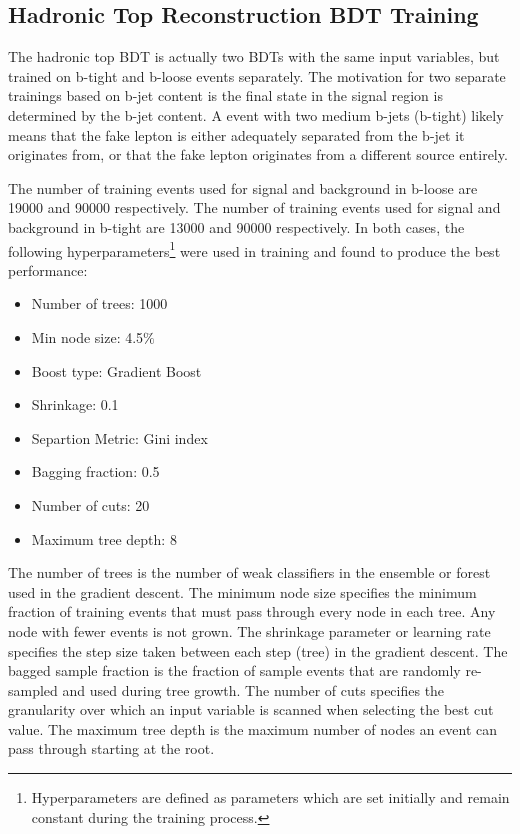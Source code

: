 \subsection{Hadronic Top Reconstruction BDT Training}
The hadronic top BDT is actually two BDTs with the same input variables, but trained on b-tight and b-loose events separately. The motivation for two separate trainings based on b-jet
content is the \ttbar final state in the signal region is determined by the b-jet content. A \ttbar event with two medium b-jets (b-tight) likely means that the fake lepton is either
adequately separated from the b-jet it originates from, or that the fake lepton originates from a different source entirely.

The number of training events used for signal and background in b-loose are 19000 and 90000 respectively.
The number of training events used for signal and background in b-tight are 13000 and 90000 respectively.
In both cases, the following hyperparameters\footnote{Hyperparameters are defined as parameters which are set initially and remain constant during the training process.}
were used in training and found to produce the best performance:

\begin{itemize}
\item Number of trees: 1000
\item Min node size: 4.5$\%$
\item Boost type: Gradient Boost
\item Shrinkage: 0.1
\item Separtion Metric: Gini index
\item Bagging fraction: 0.5
\item Number of cuts: 20
\item Maximum tree depth: 8
\end{itemize}

\noindent The number of trees is the number of weak classifiers in the ensemble or forest used in the gradient descent. The minimum node size specifies the minimum fraction of training events that must pass
through every node in each tree. Any node with fewer events is not grown. The shrinkage parameter or learning rate specifies the step size taken between each step (tree) in the gradient descent.
The bagged sample fraction is the fraction of sample events that are randomly re-sampled and used during tree growth. The number of cuts specifies the granularity over which an input variable is scanned
when selecting the best cut value. The maximum tree depth is the maximum number of nodes an event can pass through starting at the root. 

